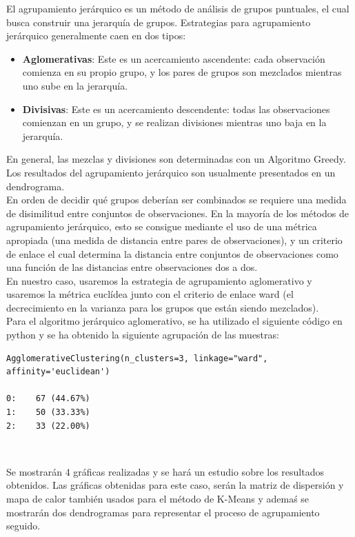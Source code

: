 \documentclass[a4paper, 20pt]{article}
\begin{document}
{El agrupamiento jerárquico es un método de análisis de grupos puntuales, el cual busca construir una jerarquía de grupos. Estrategias para agrupamiento jerárquico generalmente caen en dos tipos: 

\begin{itemize}
\item \textbf{Aglomerativas}: Este es un acercamiento ascendente: cada observación comienza en su propio grupo, y los pares de grupos son mezclados mientras uno sube en la jerarquía.
\item \textbf{Divisivas}: Este es un acercamiento descendente: todas las observaciones comienzan en un grupo, y se realizan divisiones mientras uno baja en la jerarquía.
\end{itemize}

En general, las mezclas y divisiones son determinadas con un Algoritmo Greedy. Los resultados del agrupamiento jerárquico son usualmente presentados en un dendrograma.\\

En orden de decidir qué grupos deberían ser combinados se requiere una medida de disimilitud entre conjuntos de observaciones. En la mayoría de los métodos de agrupamiento jerárquico, esto se consigue mediante el uso de una métrica apropiada (una medida de distancia entre pares de observaciones), y un criterio de enlace el cual determina la distancia entre conjuntos de observaciones como una función de las distancias entre observaciones dos a dos.\\

En nuestro caso, usaremos la estrategia de agrupamiento aglomerativo y usaremos la métrica euclídea junto con el criterio de enlace ward (el decrecimiento en la varianza para los grupos que están siendo mezclados).\\

Para el algoritmo jerárquico aglomerativo, se ha utilizado el siguiente código en python y se ha obtenido la siguiente agrupación de las muestras:\\

\begin{lstlisting}
AgglomerativeClustering(n_clusters=3, linkage="ward", affinity='euclidean')

0:    67 (44.67%)
1:    50 (33.33%)
2:    33 (22.00%)
\end{lstlisting}\

Se mostrarán 4 gráficas realizadas y se hará un estudio sobre los resultados obtenidos. Las gráficas obtenidas para este caso, serán la matriz de dispersión y mapa de calor también usados para el método de K-Means y ademaś se mostrarán dos dendrogramas para representar el proceso de agrupamiento seguido.\\

}
\end{document}
